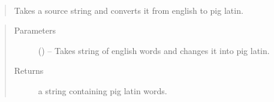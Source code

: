 \documentclass[letterpaper,10pt,english]{sphinxmanual}
\begin{document}
\begin{fulllineitems}
\label{\detokenize{code:hp_spells.pigLatin}}~\begin{quote}

Takes a source string and converts it from english to pig latin.
\end{quote}
\begin{quote}\begin{description}
\item[{Parameters}] \leavevmode
{} () -- Takes string of english words and changes it into pig latin.

\item[{Returns}] \leavevmode
a string containing pig latin words.

\end{description}\end{quote}

\end{fulllineitems}

\end{document}
